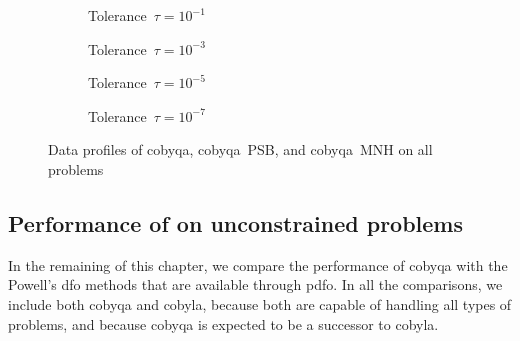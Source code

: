 \begin{figure}[ht]
    \centering
    \begin{subfigure}[b]{0.49\textwidth}
        \centering
        \caption{Tolerance~$\tau = 10^{-1}$}
    \end{subfigure}
    \hfill
    \begin{subfigure}[b]{0.49\textwidth}
        \centering
        \caption{Tolerance~$\tau = 10^{-3}$}
    \end{subfigure}
    \begin{subfigure}[b]{0.49\textwidth}
        \centering
        \caption{Tolerance~$\tau = 10^{-5}$}
    \end{subfigure}
    \hfill
    \begin{subfigure}[b]{0.49\textwidth}
        \centering
        \caption{Tolerance~$\tau = 10^{-7}$}
    \end{subfigure}
    \caption[Data profiles with different models]{Data profiles of \gls{cobyqa}, \gls{cobyqa}~PSB, and \gls{cobyqa}~MNH on all problems}
    \label{fig:data-models}
\end{figure}


\subsection{Performance of  on unconstrained problems}
\label{subsec:perf-cobyqa-unconstrained-problems}

In the remaining of this chapter, we compare the performance of \gls{cobyqa} with the Powell's \gls{dfo} methods that are available through \gls{pdfo}.
In all the comparisons, we include both \gls{cobyqa} and \gls{cobyla}, because both are capable of handling all types of problems, and because \gls{cobyqa} is expected to be a successor to \gls{cobyla}.

